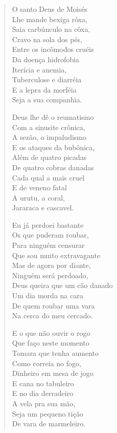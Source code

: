 \begin{verse}
O santo Deus de Moisés\\
Lhe mande bexiga rôxa,\\
Saia carbúnculo na côxa,\\
Cravo na sola dos pés,\\
Entre os incômodos cruéis\\
Da doença hidrofobia\\
Iterícia e anemia,\\
Tuberculose e diarréia\\
E a lepra da morféia\\
Seja a sua companhia.

Deus lhe dê o reumatismo\\
Com a sinusite crônica,\\
A sezão, o impaludismo\\
E os ataques da bubônica,\\
Além de quatro picadas\\
De quatro cobras danadas\\
Cada qual a mais cruel\\
E de veneno fatal\\
A urutu, a coral,\\
Jararaca e cascavel.

Eu já perdoei bastante\\
Os que puderam roubar,\\
Para ninguém censurar\\
Que sou muito extravagante\\
Mas de agora por diante,\\
Ninguém será perdoado,\\
Deus queira que um cão danado\\
Um dia morda na cara\\
De quem roubar uma vara\\
Na cerca do meu cercado.

E o que não ouvir o rogo\\
Que faço neste momento\\
Tomara que tenha aumento\\
Como correia no fogo,\\
Dinheiro em mesa de jogo\\
E cana no tabuleiro\\
E no dia derradeiro\\
A vela pra sua mão,\\
Seja um pequeno tição\\
De vara de marmeleiro.
\end{verse}

